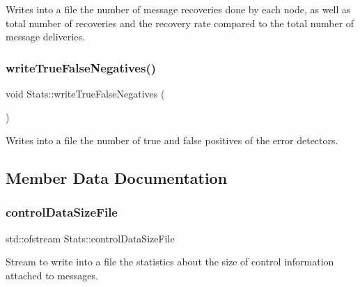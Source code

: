 Writes into a file the number of message recoveries done by each node, as well as total number of recoveries and the recovery rate compared to the total number of message deliveries. 

\mbox{\label{class_stats_aa76e3bfd22087fad066c5a628a269d06}} 
\subsubsection{\texorpdfstring{write\+True\+False\+Negatives()}{writeTrueFalseNegatives()}}
{\footnotesize\ttfamily void Stats\+::write\+True\+False\+Negatives (\begin{DoxyParamCaption}{ }\end{DoxyParamCaption})\hspace{0.3cm}{\ttfamily [private]}}



Writes into a file the number of true and false positives of the error detectors. 



\subsection{Member Data Documentation}
\mbox{\label{class_stats_ac31328205361c1581099a3ed67d5ca1a}} 
\subsubsection{\texorpdfstring{control\+Data\+Size\+File}{controlDataSizeFile}}
{\footnotesize\ttfamily std\+::ofstream Stats\+::control\+Data\+Size\+File\hspace{0.3cm}{\ttfamily [private]}}



Stream to write into a file the statistics about the size of control information attached to messages. 

\mbox{\label{class_stats_a3043ea15c3972ce785b42107fd9c1f5e}} 
